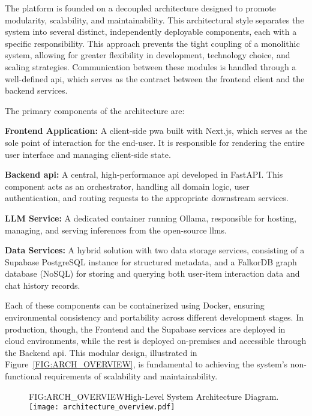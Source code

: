 The platform is founded on a decoupled architecture designed to promote modularity, scalability, and maintainability. This architectural style separates the system into several distinct, independently deployable components, each with a specific responsibility. This approach prevents the tight coupling of a monolithic system, allowing for greater flexibility in development, technology choice, and scaling strategies. Communication between these modules is handled through a well-defined \acs{api}, which serves as the contract between the frontend client and the backend services.

The primary components of the architecture are:
\begin{compactitem}[\textbullet]
    \item \textbf{Frontend Application:} A client-side \ac{pwa} built with Next.js, which serves as the sole point of interaction for the end-user. It is responsible for rendering the entire user interface and managing client-side state.
    \item \textbf{Backend \acs{api}:} A central, high-performance \acs{api} developed in FastAPI. This component acts as an orchestrator, handling all domain logic, user authentication, and routing requests to the appropriate downstream services.
    \item \textbf{LLM Service:} A dedicated container running Ollama, responsible for hosting, managing, and serving inferences from the open-source \acp{llm}.
    \item \textbf{Data Services:} A hybrid solution with two data storage services, consisting of a Supabase PostgreSQL instance for structured metadata, and a FalkorDB graph database (NoSQL) for storing and querying both user-item interaction data and chat history records.
\end{compactitem}

Each of these components can be containerized using Docker, ensuring environmental consistency and portability across different development stages. In production, though, the Frontend and the Supabase services are deployed in cloud environments, while the rest is deployed on-premises and accessible through the Backend \acs{api}. This modular design, illustrated in Figure~\ref{FIG:ARCH_OVERVIEW}, is fundamental to achieving the system's non-functional requirements of scalability and maintainability.

\begin{figure}[System Architecture Diagram]{FIG:ARCH_OVERVIEW}{High-Level System Architecture Diagram.}
    \centering
    \texttt{[image: architecture\_overview.pdf]}
\end{figure}
